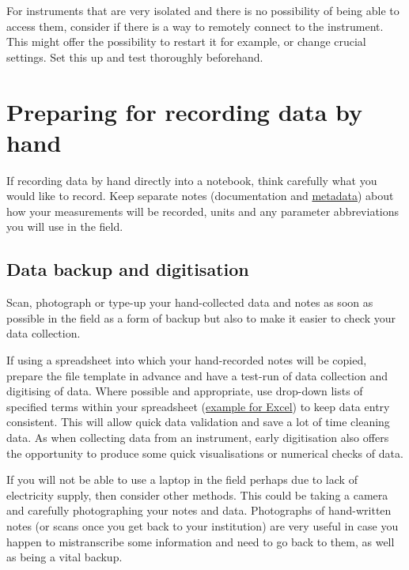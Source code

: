 \documentclass[a4paper,oneside]{report}
\begin{document}
For instruments that are very isolated and there is no possibility of
being able to access them, consider if there is a way to remotely
connect to the instrument. This might offer the possibility to restart
it for example, or change crucial settings. Set this up and test
thoroughly beforehand.

\hypertarget{preparing-for-recording-data-by-hand}{%
\section{Preparing for recording data by
hand}\label{preparing-for-recording-data-by-hand}}

If recording data by hand directly into a notebook, think carefully what
you would like to record. Keep separate notes (documentation and
\protect\hyperlink{metadata}{metadata}) about how your measurements will
be recorded, units and any parameter abbreviations you will use in the
field.

\hypertarget{data-backup-and-digitisation}{%
\subsection{Data backup and
digitisation}\label{data-backup-and-digitisation}}

Scan, photograph or type-up your hand-collected data and notes as soon
as possible in the field as a form of backup but also to make it easier
to check your data collection.

If using a spreadsheet into which your hand-recorded notes will be
copied, prepare the file template in advance and have a test-run of data
collection and digitising of data. Where possible and appropriate, use
drop-down lists of specified terms within your spreadsheet
(\href{https://www.excelefficiency.com/create-drop-down-lists-in-excel/}{example
for Excel}) to keep data entry consistent. This will allow quick data
validation and save a lot of time cleaning data. As when collecting data
from an instrument, early digitisation also offers the opportunity to
produce some quick visualisations or numerical checks of data.

If you will not be able to use a laptop in the field perhaps due to lack
of electricity supply, then consider other methods. This could be taking
a camera and carefully photographing your notes and data. Photographs of
hand-written notes (or scans once you get back to your institution) are
very useful in case you happen to mistranscribe some information and
need to go back to them, as well as being a vital backup.
\end{document}
